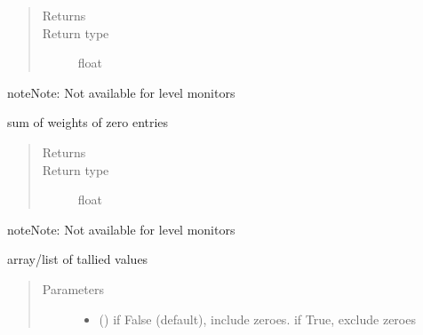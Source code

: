 \documentclass[letterpaper,10pt,english]{sphinxmanual}
\begin{document}
\begin{fulllineitems}
\begin{fulllineitems}
\begin{quote}
\begin{description}
\item[{Returns}] \leavevmode
{}

\item[{Return type}] \leavevmode
float

\end{description}\end{quote}

\begin{sphinxadmonition}{note}{Note:}
Not available for level monitors
\end{sphinxadmonition}

\end{fulllineitems}


\begin{fulllineitems}
\label{\detokenize{Reference:salabim.Monitor.weight_zero}}
sum of weights of zero entries
\begin{quote}\begin{description}
\item[{Returns}] \leavevmode
{}

\item[{Return type}] \leavevmode
float

\end{description}\end{quote}

\begin{sphinxadmonition}{note}{Note:}
Not available for level monitors
\end{sphinxadmonition}

\end{fulllineitems}


\begin{fulllineitems}
\label{\detokenize{Reference:salabim.Monitor.x}}
array/list of tallied values
\begin{quote}\begin{description}
\item[{Parameters}] \leavevmode\begin{itemize}
\item {} 
 () \textendash{} if False (default), include zeroes. if True, exclude zeroes


\end{itemize}
\end{description}
\end{quote}
\end{fulllineitems}
\end{fulllineitems}
\end{document}
